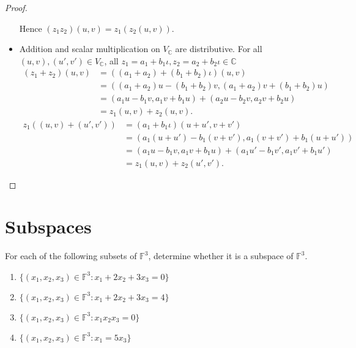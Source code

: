 \begin{proof}
\begin{itemize}
              Hence $(z_{1}z_{2})(u, v) = z_{1}(z_{2}(u, v))$.
        \item Addition and scalar multiplication on $V_{\mathbb{C}}$ are distributive. For all $(u, v), (u', v')\in V_{\mathbb{C}}$, all $z_{1} = a_{1} + b_{1}\iota, z_{2} = a_{2} + b_{2}\iota\in \mathbb{C}$
              \begin{align*}
                  (z_{1} + z_{2})(u, v) & = ((a_{1} + a_{2}) + (b_{1} + b_{2})\iota)(u, v)                             \\
                                        & = ((a_{1} + a_{2})u - (b_{1} + b_{2})v, (a_{1} + a_{2})v + (b_{1} + b_{2})u) \\
                                        & = (a_{1}u - b_{1}v, a_{1}v + b_{1}u) + (a_{2}u - b_{2}v, a_{2}v + b_{2}u)    \\
                                        & = z_{1}(u, v) + z_{2}(u, v).
              \end{align*}
              \begin{align*}
                  z_{1}((u, v) + (u', v')) & = (a_{1} + b_{1}\iota)(u + u', v + v')                                        \\
                                           & = (a_{1}(u + u') - b_{1}(v + v'), a_{1}(v + v') + b_{1}(u + u'))              \\
                                           & = (a_{1}u - b_{1}v, a_{1}v + b_{1}u) + (a_{1}u' - b_{1}v', a_{1}v' + b_{1}u') \\
                                           & = z_{1}(u, v) + z_{2}(u', v').
              \end{align*}
    \end{itemize}
\end{proof}

\section{Subspaces}

\begin{exercise}
    For each of the following subsets of $\mathbb{F}^{3}$, determine whether it is a subspace of $\mathbb{F}^{3}$.
    \begin{enumerate}[label={(\alph*)}]
        \item $\{ (x_{1}, x_{2}, x_{3})\in \mathbb{F}^{3}: x_{1} + 2x_{2} + 3x_{3} = 0 \}$
        \item $\{ (x_{1}, x_{2}, x_{3})\in \mathbb{F}^{3}: x_{1} + 2x_{2} + 3x_{3} = 4 \}$
        \item $\{ (x_{1}, x_{2}, x_{3})\in \mathbb{F}^{3}: x_{1}x_{2}x_{3} = 0 \}$
        \item $\{ (x_{1}, x_{2}, x_{3})\in \mathbb{F}^{3}: x_{1} = 5x_{3} \}$
    \end{enumerate}
\end{exercise}

